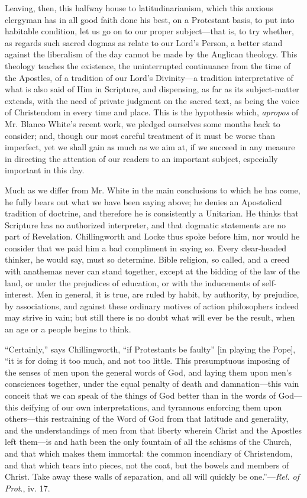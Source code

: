 Leaving, then, this halfway house to
latitudinarianism, which this anxious clergyman has in all good faith
done his best, on a Protestant basis, to put into habitable condition,
let us go on to our proper subject—that is, to try whether, as
regards such sacred dogmas as relate to our Lord's Person, a better
stand against the liberalism of the day cannot be made by the Anglican
theology. This theology teaches the existence, the uninterrupted
continuance from the time of the Apostles, of a tradition of our Lord's
Divinity—a tradition interpretative of what is also said of Him in
Scripture, and dispensing, as far as its subject-matter extends, with
the need of private judgment on the sacred text, as being the voice of
Christendom in every time and place. This is the hypothesis which, \emph{apropos}
of Mr. Blanco White's recent work, we pledged ourselves some months
back to consider; and, though our most careful treatment of it must be
worse than imperfect, yet we shall gain as much as we aim at, if we
succeed in any measure in directing the attention of our readers to an
important subject, especially important in this day.

Much as we differ from Mr. White in the main
conclusions to which he has come, he fully bears out what we have been
saying above; he denies an Apostolical tradition of doctrine, and
therefore he is consistently a Unitarian. He thinks that Scripture has
no authorized interpreter, and that dogmatic statements are no part of
Revelation. Chillingworth and Locke thus spoke before him, nor would
he consider that we paid him a bad compliment in saying so. Every
clear-headed thinker, he would say, must so determine. Bible religion,
so called, and a creed with anathemas never can stand together, except
at the bidding of the law of the land, or under the prejudices
of education, or with the inducements of self-interest. Men in
general, it is true, are ruled by habit, by authority, by prejudice,
by associations, and against these ordinary motives of action
philosophers indeed may strive in vain; but still there is no doubt
what will ever be the result, when an age or a people begins to think.

``Certainly,''
says Chillingworth, ``if Protestants be faulty'' [in playing the Pope], ``it
is for doing it too much, and not too little. This presumptuous
imposing of the senses of men upon the general words of God, and
laying them upon men's consciences together, under the equal penalty
of death and damnation—this vain conceit that we can speak of the
things of God better than in the words of God—this deifying of our
own interpretations, and tyrannous enforcing them upon others—this
restraining of the Word of God from that latitude and generality, and
the understandings of men from that liberty wherein Christ and the
Apostles left them—is and hath been the only fountain of all the
schisms of the Church, and that which makes them immortal: the common
incendiary of Christendom, and that which tears into pieces, not the
coat, but the bowels and members of Christ. Take away these walls of
separation, and all will quickly be one.''—\emph{Rel. of Prot}., iv.
17.

